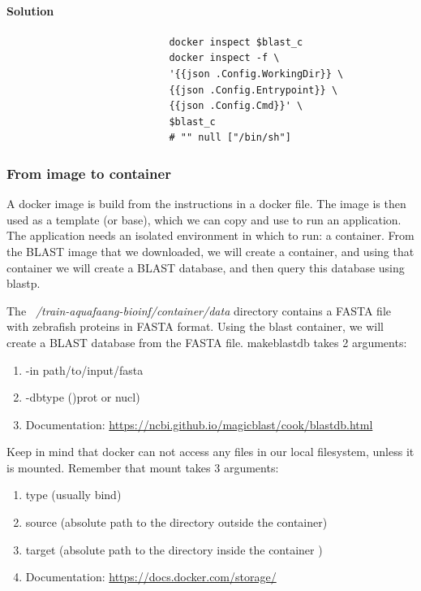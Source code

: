 \documentclass[12pt]{article}
\begin{document}
				\paragraph{Solution}	
					
					\begin{minipage}{\linewidth}
						\begin{lstlisting}
							docker inspect $blast_c 
							docker inspect -f \
							'{{json .Config.WorkingDir}} \
							{{json .Config.Entrypoint}} \
							{{json .Config.Cmd}}' \ 
							$blast_c
							# "" null ["/bin/sh"]
						\end{lstlisting}
				\end{minipage}
		
			\subsubsection{From image to container}		
				A docker image is build from the instructions in a docker file.  			
				The image is then used as a template (or base), which we can copy and use to run an application. 
				The application needs an isolated environment in which to run: a container.
				From the BLAST image that we downloaded, we will create a container, and using that container we will create a BLAST database, and then query this database using blastp.
					
				The \textit{~/train-aquafaang-bioinf/container/data} directory contains a FASTA file with zebrafish proteins in FASTA format. 
				Using the blast container, we will create a BLAST database from the FASTA file.
				makeblastdb takes 2 arguments: 
				
				\begin{enumerate}
					\item -in path/to/input/fasta  
					\item -dbtype ()prot or nucl)
					\item Documentation: \url{https://ncbi.github.io/magicblast/cook/blastdb.html}
				\end{enumerate}
				
				Keep in mind that docker can not access any files in our local filesystem, unless it is mounted. 
				Remember that mount takes 3 arguments: 
				\begin{enumerate}
					\item type (usually bind)  
					\item source (absolute path to the directory outside the container)
					\item target (absolute path to the directory inside the container )
					\item Documentation:  \url{https://docs.docker.com/storage/}
				\end{enumerate}
			
\end{document}

